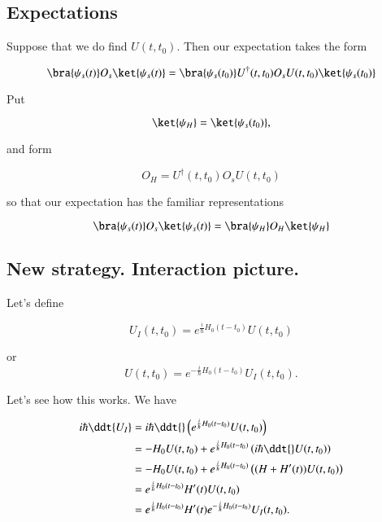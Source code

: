 \subsection{Expectations}

Suppose that we do find $U(t, t_0)$.  Then our expectation takes the form

\begin{equation}\label{eqn:qmTwoL6:600}
\bra{\psi_s(t)} O_s \ket{\psi_s(t)} 
= 
\bra{\psi_s(t_0)} U^\dagger(t, t_0) O_s U(t, t_0) \ket{\psi_s(t_0)} 
\end{equation}

Put

\begin{equation}\label{eqn:qmTwoL6:620}
\ket{\psi_H} = \ket{\psi_s(t_0)},
\end{equation}

and form

\begin{equation}\label{eqn:qmTwoL6:640}
O_H = U^\dagger(t, t_0) O_s U(t, t_0) 
\end{equation}

so that our expectation has the familiar representations

\begin{equation}\label{eqn:qmTwoL6:660}
\bra{\psi_s(t)} O_s \ket{\psi_s(t)} 
=
\bra{\psi_H} O_H \ket{\psi_H} 
\end{equation}

\subsection{New strategy.  Interaction picture.}

Let's define 

\begin{equation}\label{eqn:qmTwoL6:680}
U_I(t, t_0) = e^{\frac{i}{\hbar} H_0(t - t_0)} U(t, t_0)
\end{equation}

or
\begin{equation}\label{eqn:qmTwoL6:700}
U(t, t_0) = e^{-\frac{i}{\hbar} H_0(t - t_0)} U_I(t, t_0).
\end{equation}

Let's see how this works.  We have

\begin{align*}
i \hbar \ddt{U_I} 
&= 
i \hbar \ddt{} \left(
e^{\frac{i}{\hbar} H_0(t - t_0)} U(t, t_0)
\right) \\
&=
-H_0 U(t, t_0)
+
e^{\frac{i}{\hbar} H_0(t - t_0)} \left( i \hbar \ddt{} U(t, t_0) \right) \\
&=
-H_0 U(t, t_0)
+
e^{\frac{i}{\hbar} H_0(t - t_0)} \left( (H + H'(t)) U(t, t_0) \right) \\
&=
e^{\frac{i}{\hbar} H_0(t - t_0)} H'(t) U(t, t_0) \\
&=
e^{\frac{i}{\hbar} H_0(t - t_0)} H'(t) e^{-\frac{i}{\hbar} H_0(t - t_0)} U_I(t, t_0).
\end{align*}

